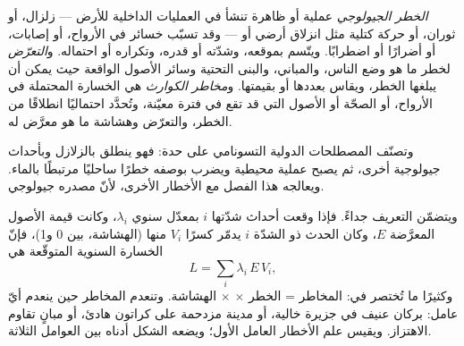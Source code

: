 \begin{definition}\label{def:b2:geological-hazards:risk}
\emph{الخطر الجيولوجي} عملية أو ظاهرة تنشأ في
العمليات الداخلية للأرض --- زلزال، أو ثوران، أو حركة كتلية مثل
انزلاق أرضي أو  --- وقد تسبّب خسائر في الأرواح، أو إصابات، أو أضرارًا أو اضطرابًا. ويتّسم
بموقعه، وشدّته أو قدره، وتكراره أو احتماله. و\emph{التعرّض} لخطر ما
هو وضع الناس، والمباني، والبنى التحتية وسائر الأصول الواقعة حيث يمكن أن يبلغها الخطر،
ويقاس بعددها أو بقيمتها. و\emph{مخاطر الكوارث} هي الخسارة المحتملة
في الأرواح، أو الصحّة أو الأصول التي قد تقع في فترة معيّنة، وتُحدَّد احتماليًا
انطلاقًا من الخطر، والتعرّض وهشاشة ما هو معرَّض له.
\end{definition}

وتصنّف المصطلحات الدولية التسونامي على حدة: فهو ينطلق بالزلازل وبأحداث
جيولوجية أخرى، ثم يصبح عملية محيطية ويضرب بوصفه خطرًا ساحليًا مرتبطًا بالماء.
ويعالجه هذا الفصل مع الأخطار الأخرى، لأنّ مصدره جيولوجي.

ويتضمّن التعريف جداءً. فإذا وقعت أحداث شدّتها $i$ بمعدّل سنوي
$\lambda_i$، وكانت قيمة الأصول المعرَّضة $E$، وكان الحدث ذو الشدّة $i$ يدمّر
كسرًا $V_i$ منها (الهشاشة، بين 0 و1)، فإنّ الخسارة السنوية المتوقّعة هي
\begin{equation}
L = \sum_i \lambda_i \, E \, V_i ,
\label{eq:b2:geological-hazards:loss}
\end{equation}
وكثيرًا ما تُختصر في: المخاطر = الخطر $\times$  $\times$ الهشاشة. وتنعدم المخاطر حين
ينعدم أيّ عامل: بركان عنيف في جزيرة خالية، أو مدينة مزدحمة على كراتون هادئ، أو
مبانٍ تقاوم الاهتزاز. ويقيس علم الأخطار العامل الأول؛ ويضعه الشكل أدناه
بين العوامل الثلاثة.

